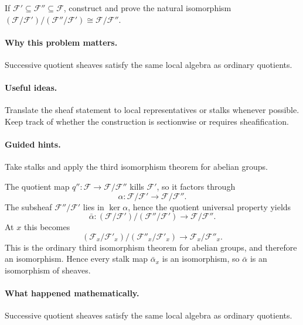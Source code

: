 \begin{problem}\label{prob:vi15-p20}
If $\mathcal F'\subseteq\mathcal F''\subseteq\mathcal F$, construct and prove the natural isomorphism $(\mathcal F/\mathcal F')/(\mathcal F''/\mathcal F')\cong\mathcal F/\mathcal F''$.
\end{problem}

\ifdefined\FullProblemDossiers
\paragraph{Why this problem matters.}
Successive quotient sheaves satisfy the same local algebra as ordinary quotients.

\paragraph{Useful ideas.}
Translate the sheaf statement to local representatives or stalks whenever possible.  Keep track of whether the construction is sectionwise or requires sheafification.

\paragraph{Guided hints.}
Take stalks and apply the third isomorphism theorem for abelian groups.

\begin{solution}
The quotient map $q'':\mathcal F\to\mathcal F/\mathcal F''$ kills $\mathcal F'$, so it factors through
\[
\alpha:\mathcal F/\mathcal F'\to\mathcal F/\mathcal F''.
\]
The subsheaf $\mathcal F''/\mathcal F'$ lies in $\ker\alpha$, hence the quotient universal property yields
\[
\bar\alpha:(\mathcal F/\mathcal F')/(\mathcal F''/\mathcal F')
\longrightarrow
\mathcal F/\mathcal F''.
\]
At $x$ this becomes
\[
(\mathcal F_x/\mathcal F'_x)/(\mathcal F''_x/\mathcal F'_x)
\longrightarrow
\mathcal F_x/\mathcal F''_x.
\]
This is the ordinary third isomorphism theorem for abelian groups, and therefore an isomorphism. Hence every stalk map $\bar\alpha_x$ is an isomorphism, so $\bar\alpha$ is an isomorphism of sheaves.
\end{solution}

\paragraph{What happened mathematically.}
Successive quotient sheaves satisfy the same local algebra as ordinary quotients.


